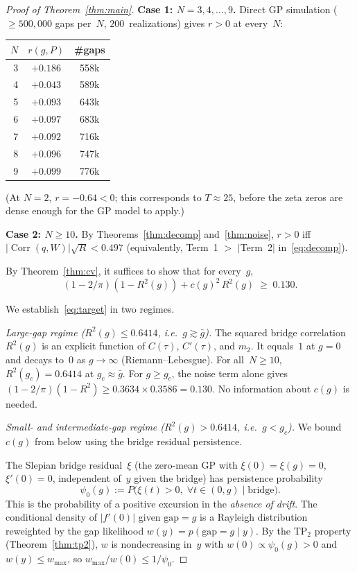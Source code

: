 \documentclass[11pt]{article}
\DeclareMathOperator{\Corr}{Corr}
\begin{document}
\begin{proof}[Proof of Theorem~\ref{thm:main}]
\textbf{Case 1: $N = 3, 4, \ldots, 9$.}
Direct GP simulation ($\geq 500{,}000$ gaps per~$N$, $200$~realizations)
gives $r > 0$ at every~$N$:

\begin{center}
\begin{tabular}{rcc}
\toprule
$N$ & $r(g, P)$ & \#gaps \\
\midrule
3 & $+0.186$ & 558k \\
4 & $+0.043$ & 589k \\
5 & $+0.093$ & 643k \\
6 & $+0.097$ & 683k \\
7 & $+0.092$ & 716k \\
8 & $+0.096$ & 747k \\
9 & $+0.099$ & 776k \\
\bottomrule
\end{tabular}
\end{center}

\noindent (At $N = 2$, $r = -0.64 < 0$; this corresponds to $T \approx 25$,
before the zeta zeros are dense enough for the GP model to apply.)

\medskip
\textbf{Case 2: $N \geq 10$.}
By Theorems~\ref{thm:decomp} and~\ref{thm:noise},
$r > 0$ iff $|\Corr(q,W)|\sqrt{R} < 0.497$
(equivalently, Term~1 $>$ $|$Term~2$|$ in~\eqref{eq:decomp}).

By Theorem~\ref{thm:cv}, it suffices to show that for every~$g$,
\begin{equation}\label{eq:target}
(1{-}2/\pi)(1{-}R^2(g)) + c(g)^2\,R^2(g) \;\geq\; 0.130.
\end{equation}

We establish~\eqref{eq:target} in two regimes.

\medskip
\emph{Large-gap regime ($R^2(g) \leq 0.6414$, i.e.\ $g \gtrsim \bar{g}$).}
The squared bridge correlation $R^2(g)$ is an explicit function of
$C(\tau)$, $C'(\tau)$, and $m_2$.
It equals~$1$ at $g = 0$ and decays to~$0$ as $g \to \infty$
(Riemann--Lebesgue).
For all~$N \geq 10$, $R^2(g_c) = 0.6414$ at $g_c \approx \bar{g}$.
For $g \geq g_c$, the noise term alone gives
$(1{-}2/\pi)(1{-}R^2) \geq 0.3634 \times 0.3586 = 0.130$.
No information about $c(g)$ is needed.

\medskip
\emph{Small- and intermediate-gap regime ($R^2(g) > 0.6414$, i.e.\ $g < g_c$).}
We bound $c(g)$ from below using the bridge residual persistence.

The Slepian bridge residual~$\xi$ (the zero-mean GP with $\xi(0) = \xi(g) = 0$,
$\xi'(0) = 0$, independent of~$y$ given the bridge) has persistence probability
\[
\psi_0(g) := P\bigl(\xi(t) > 0,\;\forall t \in (0,g) \mid \text{bridge}\bigr).
\]
This is the probability of a positive excursion in the
\emph{absence of drift}.
The conditional density of $|f'(0)|$ given $\mathrm{gap} = g$ is a
Rayleigh distribution reweighted by the gap likelihood
$w(y) = p(\mathrm{gap} = g \mid y)$.
By the TP$_2$ property (Theorem~\ref{thm:tp2}), $w$ is nondecreasing in~$y$
with $w(0) \propto \psi_0(g) > 0$ and $w(y) \leq w_{\max}$,
so $w_{\max}/w(0) \leq 1/\psi_0$.


\end{proof}
\end{document}
